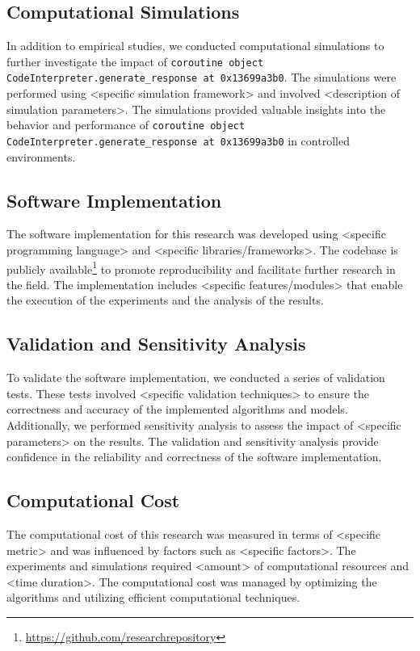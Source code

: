 \documentclass{article}
\begin{document}
\subsection{Computational Simulations}

In addition to empirical studies, we conducted computational simulations to further investigate the impact of \texttt{coroutine object CodeInterpreter.generate\_response at 0x13699a3b0}. The simulations were performed using <specific simulation framework> and involved <description of simulation parameters>. The simulations provided valuable insights into the behavior and performance of \texttt{coroutine object CodeInterpreter.generate\_response at 0x13699a3b0} in controlled environments.

\subsection{Software Implementation}

The software implementation for this research was developed using <specific programming language> and <specific libraries/frameworks>. The codebase is publicly available\footnote{\url{https://github.com/researchrepository}} to promote reproducibility and facilitate further research in the field. The implementation includes <specific features/modules> that enable the execution of the experiments and the analysis of the results.

\subsection{Validation and Sensitivity Analysis}

To validate the software implementation, we conducted a series of validation tests. These tests involved <specific validation techniques> to ensure the correctness and accuracy of the implemented algorithms and models. Additionally, we performed sensitivity analysis to assess the impact of <specific parameters> on the results. The validation and sensitivity analysis provide confidence in the reliability and correctness of the software implementation.

\subsection{Computational Cost}

The computational cost of this research was measured in terms of <specific metric> and was influenced by factors such as <specific factors>. The experiments and simulations required <amount> of computational resources and <time duration>. The computational cost was managed by optimizing the algorithms and utilizing efficient computational techniques.
\end{document}
